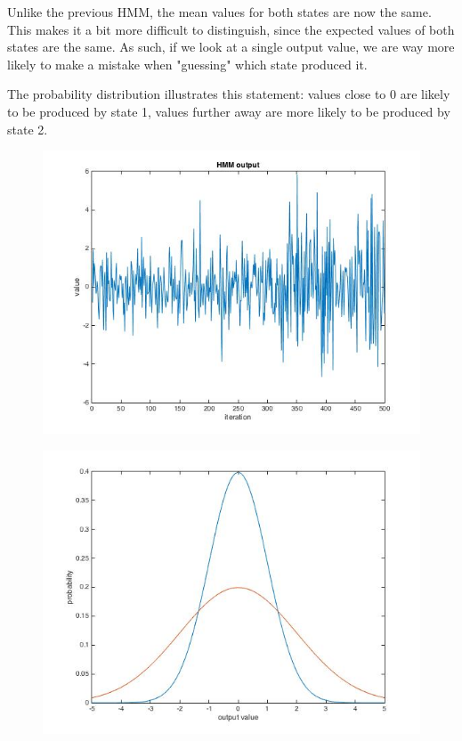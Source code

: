 Unlike the previous HMM, the mean values for both states are now the same. This makes it a bit more difficult to distinguish, since the expected values of both states are the same. As such, if we look at a single output value, we are way more likely to make a mistake when "guessing" which state produced it.

The probability distribution illustrates this statement: values close to 0 are likely to be produced by state 1, values further away are more likely to be produced by state 2.
\begin{figure}[H]
	\centering
	\includegraphics[width=.8\linewidth]{images/question_5_HMM_plot}
	\label{fig:question_5_HMM_plot}
\end{figure}%
\begin{figure}[H]
	\centering
	\includegraphics[width=.8\linewidth]{images/question_5_probability_distributions}
	\label{fig:question_5_probability_distributions}
\end{figure}


